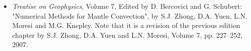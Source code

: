 
\begin{itemize} 
\item {\it Treatise on Geophysics}, Volume 7, Edited by D. Bercovici and G. Schubert: 
"Numerical Methods for Mantle Convection", by S.J. Zhong, D.A. Yuen, L.N. Moresi and M.G. Knepley. Note that it is a revision of the previous edition chapter by S.J. Zhong, D.A. Yuen and L.N. Moresi, Volume 7, pp. 227–252, 2007.

\end{itemize}
